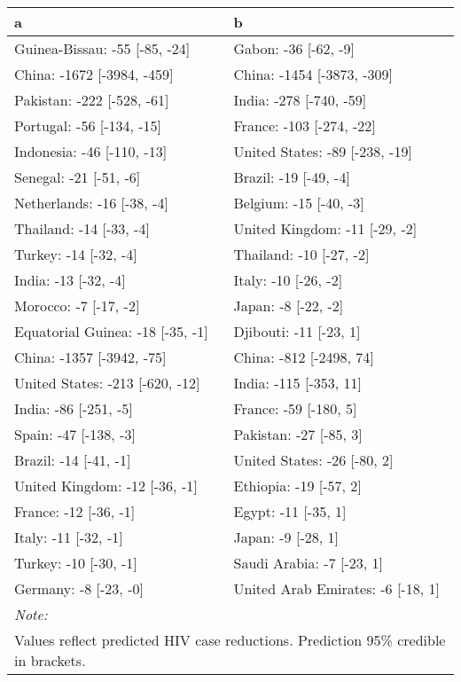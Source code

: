 \begin{table}
\centering
\begin{tabular}[t]{ll}
\toprule
a & b\\
\midrule
Guinea-Bissau: -55 [-85, -24] & Gabon: -36 [-62, -9]\\
China: -1672 [-3984, -459] & China: -1454 [-3873, -309]\\
Pakistan: -222 [-528, -61] & India: -278 [-740, -59]\\
Portugal: -56 [-134, -15] & France: -103 [-274, -22]\\
Indonesia: -46 [-110, -13] & United States: -89 [-238, -19]\\
Senegal: -21 [-51, -6] & Brazil: -19 [-49, -4]\\
Netherlands: -16 [-38, -4] & Belgium: -15 [-40, -3]\\
Thailand: -14 [-33, -4] & United Kingdom: -11 [-29, -2]\\
Turkey: -14 [-32, -4] & Thailand: -10 [-27, -2]\\
India: -13 [-32, -4] & Italy: -10 [-26, -2]\\
Morocco: -7 [-17, -2] & Japan: -8 [-22, -2]\\
\addlinespace
Equatorial Guinea: -18 [-35, -1] & Djibouti: -11 [-23, 1]\\
China: -1357 [-3942, -75] & China: -812 [-2498, 74]\\
United States: -213 [-620, -12] & India: -115 [-353, 11]\\
India: -86 [-251, -5] & France: -59 [-180, 5]\\
Spain: -47 [-138, -3] & Pakistan: -27 [-85, 3]\\
Brazil: -14 [-41, -1] & United States: -26 [-80, 2]\\
United Kingdom: -12 [-36, -1] & Ethiopia: -19 [-57, 2]\\
France: -12 [-36, -1] & Egypt: -11 [-35, 1]\\
Italy: -11 [-32, -1] & Japan: -9 [-28, 1]\\
Turkey: -10 [-30, -1] & Saudi Arabia: -7 [-23, 1]\\
Germany: -8 [-23, -0] & United Arab Emirates: -6 [-18, 1]\\
\bottomrule
\multicolumn{2}{l}{\rule{0pt}{1em}\textit{Note: }}\\
\multicolumn{2}{l}{\rule{0pt}{1em}Values reflect predicted HIV case reductions. Prediction 95\% credible in brackets.}\\
\end{tabular}
\end{table}
